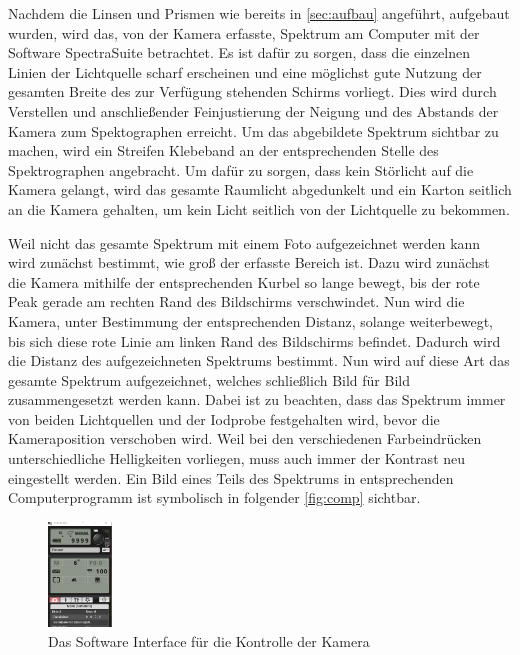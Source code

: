 \documentclass[12pt,english,ngerman]{scrartcl}
\begin{document}
Nachdem die Linsen und Prismen wie bereits in \autoref{sec:aufbau} angeführt,
aufgebaut wurden, wird das, von der Kamera erfasste, Spektrum am Computer mit
der Software SpectraSuite betrachtet. Es ist dafür zu sorgen, dass die
einzelnen Linien der Lichtquelle scharf erscheinen und eine möglichst gute
Nutzung der gesamten Breite des zur Verfügung stehenden Schirms vorliegt. Dies
wird durch Verstellen und anschließender Feinjustierung der Neigung und des
Abstands der Kamera zum Spektographen erreicht. Um das abgebildete Spektrum
sichtbar zu machen, wird ein Streifen Klebeband an der entsprechenden Stelle
des Spektrographen angebracht. Um dafür zu sorgen, dass kein Störlicht auf die
Kamera gelangt, wird das gesamte Raumlicht abgedunkelt und ein Karton seitlich
an die Kamera gehalten, um kein Licht seitlich von der Lichtquelle zu bekommen.

Weil nicht das gesamte Spektrum mit einem Foto aufgezeichnet werden kann wird
zunächst bestimmt, wie groß der erfasste Bereich ist. Dazu wird zunächst die
Kamera mithilfe der entsprechenden Kurbel so lange bewegt, bis der rote Peak
gerade am rechten Rand des Bildschirms verschwindet. Nun wird die Kamera, unter
Bestimmung der entsprechenden Distanz, solange weiterbewegt, bis sich diese
rote Linie am linken Rand des Bildschirms befindet. Dadurch wird die Distanz
des aufgezeichneten Spektrums bestimmt. Nun wird auf diese Art das gesamte
Spektrum aufgezeichnet, welches schließlich Bild für Bild zusammengesetzt
werden kann. Dabei ist zu beachten, dass das Spektrum immer von beiden
Lichtquellen und der Iodprobe festgehalten wird, bevor die Kameraposition
verschoben wird. Weil bei den verschiedenen Farbeindrücken unterschiedliche
Helligkeiten vorliegen, muss auch immer der Kontrast neu eingestellt werden.
Ein Bild eines Teils des Spektrums in entsprechenden Computerprogramm ist
symbolisch in folgender \autoref{fig:comp} sichtbar.

\begin{figure}
	\begin{center}
		\includegraphics[width=0.15\textwidth]{figures/camerasoftware.png}
	\end{center}
	\caption{Das Software Interface für die Kontrolle der Kamera
	}\label{fig:comp}
\end{figure}
\end{document}

